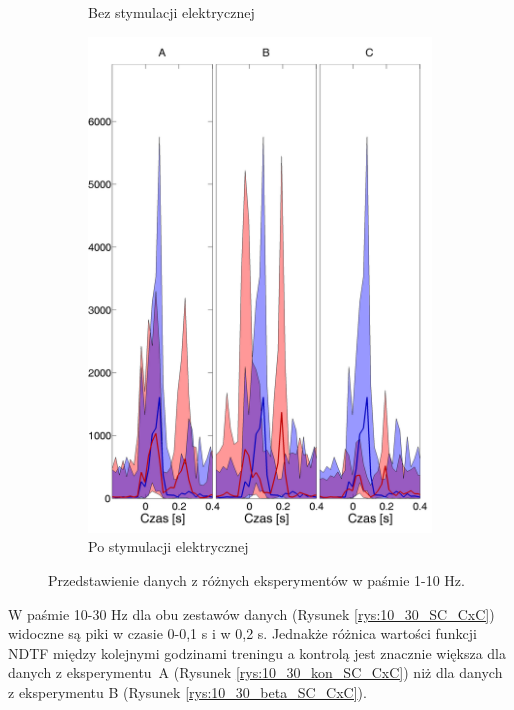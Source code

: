 \documentclass{pracamgr}
\begin{document}
\begin{figure}[h]
\begin{subfigure}{.5\textwidth}
			\caption{Bez stymulacji elektrycznej}
			\label{rys:1_10_kon_SC_CxC}
		\end{subfigure}%
		\begin{subfigure}{.5\textwidth}
			\centering
			\includegraphics[width=1.\linewidth]{beta3_1-10_z_SC2_do_CxC82.png}
			\caption{Po stymulacji elektrycznej}
			\label{rys:1_10_beta_SC_CxC}
		\end{subfigure}
		\caption{Przedstawienie danych z różnych eksperymentów w paśmie 1-10 Hz.}
		\label{rys:1_10_SC_CxC}
	\end{figure}
	\FloatBarrier
	W paśmie 10-30 Hz dla obu zestawów danych (Rysunek \ref{rys:10_30_SC_CxC}) widoczne są piki w czasie 0-0,1 s i w 0,2 s. Jednakże różnica wartości funkcji NDTF między kolejnymi godzinami treningu a kontrolą jest znacznie większa dla danych z eksperymentu~A (Rysunek \ref{rys:10_30_kon_SC_CxC}) niż dla danych z eksperymentu B (Rysunek \ref{rys:10_30_beta_SC_CxC}).
\end{document}
